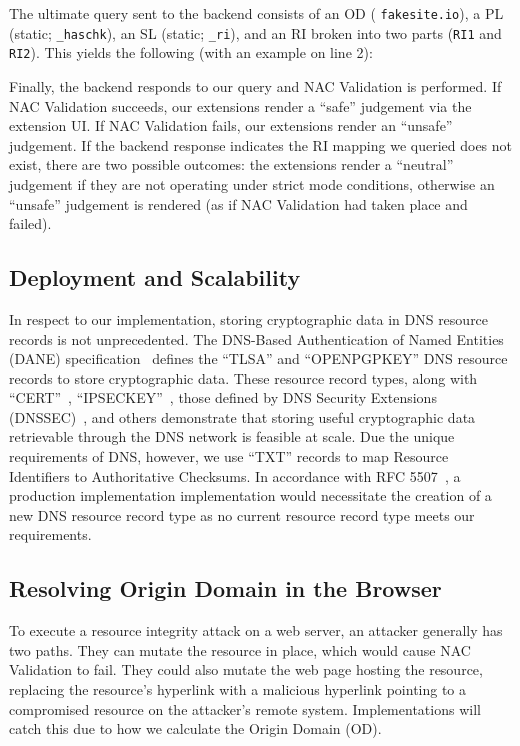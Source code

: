 The ultimate query sent to the backend consists of an OD (\eg
\texttt{fakesite.io}), a PL (static; \ie \texttt{\_haschk}), an SL (static; \ie
\texttt{\_ri}), and an RI broken into two parts (\ie \texttt{RI1} and
\texttt{RI2}). This yields the following (with an example on line 2): \\

Finally, the backend responds to our query and NAC Validation is performed. If
NAC Validation succeeds, our extensions render a ``safe'' judgement via the
extension UI. If NAC Validation fails, our extensions render an ``unsafe''
judgement. If the backend response indicates the RI mapping we queried does not
exist, there are two possible outcomes: the extensions render a ``neutral''
judgement if they are not operating under strict mode conditions, otherwise an
``unsafe'' judgement is rendered (as if NAC Validation had taken place and
failed).

\subsection{Deployment and Scalability}


In respect to our implementation, storing cryptographic data in DNS resource
records is not unprecedented. The DNS-Based Authentication of Named Entities
(DANE) specification~\cite{DANE1, DANE2, DANE3} defines the ``TLSA'' and
``OPENPGPKEY'' DNS resource records to store cryptographic data. These resource
record types, along with ``CERT''~\cite{CERT}, ``IPSECKEY''~\cite{IPSECKEY},
those defined by DNS Security Extensions (DNSSEC)~\cite{DNSSEC}, and others
demonstrate that storing useful cryptographic data retrievable through the DNS
network is feasible at scale. Due the unique requirements of DNS, however, we
use ``TXT'' records to map Resource Identifiers to Authoritative Checksums. In
accordance with RFC 5507~\cite{RFC5507}, a production implementation
implementation would necessitate the creation of a new DNS resource record type
as no current resource record type meets our requirements.

\subsection{Resolving Origin Domain in the Browser}

To execute a resource integrity attack on a web server, an attacker generally
has two paths. They can mutate the resource in place, which would cause NAC
Validation to fail. They could also mutate the web page hosting the resource,
replacing the resource's hyperlink with a malicious hyperlink pointing to a
compromised resource on the attacker's remote system. Implementations will catch
this due to how we calculate the Origin Domain (OD).

